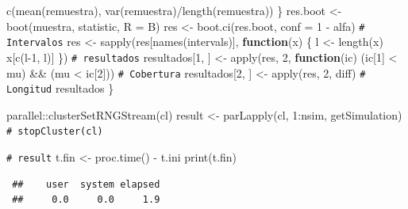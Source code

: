 \documentclass[
  10pt,
]{book}
\newenvironment{Shaded}{\begin{snugshade}}{\end{snugshade}}
\newcommand{\AttributeTok}[1]{\textcolor[rgb]{0.77,0.63,0.00}{#1}}
\newcommand{\CommentTok}[1]{\textcolor[rgb]{0.56,0.35,0.01}{\textit{#1}}}
\newcommand{\ControlFlowTok}[1]{\textcolor[rgb]{0.13,0.29,0.53}{\textbf{#1}}}
\newcommand{\DecValTok}[1]{\textcolor[rgb]{0.00,0.00,0.81}{#1}}
\newcommand{\FunctionTok}[1]{\textcolor[rgb]{0.00,0.00,0.00}{#1}}
\newcommand{\NormalTok}[1]{#1}
\newcommand{\OtherTok}[1]{\textcolor[rgb]{0.56,0.35,0.01}{#1}}
\newcommand{\SpecialCharTok}[1]{\textcolor[rgb]{0.00,0.00,0.00}{#1}}
\theoremstyle{break}
\theoremstyle{nonumberplain}
\renewcommand{\CommentTok}[1]{\textcolor[rgb]{0.41,0.41,0.41}{\texttt{#1}}}
\begin{document}
\begin{Shaded}
\begin{Highlighting}[]
      \FunctionTok{c}\NormalTok{(}\FunctionTok{mean}\NormalTok{(remuestra), }\FunctionTok{var}\NormalTok{(remuestra)}\SpecialCharTok{/}\FunctionTok{length}\NormalTok{(remuestra))}
\NormalTok{    \}}
\NormalTok{    res.boot }\OtherTok{\textless{}{-}} \FunctionTok{boot}\NormalTok{(muestra, statistic, }\AttributeTok{R =}\NormalTok{ B)}
\NormalTok{    res }\OtherTok{\textless{}{-}} \FunctionTok{boot.ci}\NormalTok{(res.boot, }\AttributeTok{conf =} \DecValTok{1} \SpecialCharTok{{-}}\NormalTok{ alfa)}
    \CommentTok{\# Intervalos}
\NormalTok{    res }\OtherTok{\textless{}{-}} \FunctionTok{sapply}\NormalTok{(res[}\FunctionTok{names}\NormalTok{(intervals)], }\ControlFlowTok{function}\NormalTok{(x) \{}
\NormalTok{      l }\OtherTok{\textless{}{-}} \FunctionTok{length}\NormalTok{(x)}
\NormalTok{      x[}\FunctionTok{c}\NormalTok{(l}\DecValTok{{-}1}\NormalTok{, l)]}
\NormalTok{    \})}
    \CommentTok{\# resultados}
\NormalTok{    resultados[}\DecValTok{1}\NormalTok{, ] }\OtherTok{\textless{}{-}} \FunctionTok{apply}\NormalTok{(res, }\DecValTok{2}\NormalTok{,}
                                   \ControlFlowTok{function}\NormalTok{(ic) (ic[}\DecValTok{1}\NormalTok{] }\SpecialCharTok{\textless{}}\NormalTok{ mu) }\SpecialCharTok{\&\&}\NormalTok{ (mu }\SpecialCharTok{\textless{}}\NormalTok{ ic[}\DecValTok{2}\NormalTok{])) }\CommentTok{\# Cobertura}
\NormalTok{    resultados[}\DecValTok{2}\NormalTok{, ] }\OtherTok{\textless{}{-}} \FunctionTok{apply}\NormalTok{(res, }\DecValTok{2}\NormalTok{, diff) }\CommentTok{\# Longitud}
\NormalTok{    resultados}
\NormalTok{\}}

\NormalTok{parallel}\SpecialCharTok{::}\FunctionTok{clusterSetRNGStream}\NormalTok{(cl)}
\NormalTok{result }\OtherTok{\textless{}{-}} \FunctionTok{parLapply}\NormalTok{(cl, }\DecValTok{1}\SpecialCharTok{:}\NormalTok{nsim, getSimulation)}
\CommentTok{\# stopCluster(cl)}

\CommentTok{\# result}
\NormalTok{t.fin }\OtherTok{\textless{}{-}} \FunctionTok{proc.time}\NormalTok{() }\SpecialCharTok{{-}}\NormalTok{ t.ini}
\FunctionTok{print}\NormalTok{(t.fin)}
\end{Highlighting}
\end{Shaded}

\begin{verbatim}
 ##    user  system elapsed 
 ##     0.0     0.0     1.9
\end{verbatim}
\end{document}
